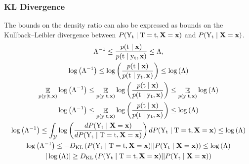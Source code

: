 
\subsubsection{KL Divergence}
\label{app:kld}
The bounds on the density ratio can also be expressed as bounds on the Kullback–Leibler divergence between $P(\Yt \mid \Tf=\tf, \X=\x)$ and $P(\Yt \mid \X=\x)$.
\begin{gather}
    \Lambda^{-1} \leq \frac{p(\tf \mid \x)}{p(\tf \mid \yt, \x)} \leq \Lambda, \\
    \log{\left(\Lambda^{-1}\right)}  \leq \log{\left(\frac{p(\tf \mid \x)}{p(\tf \mid \yt, \x)}\right)}  \leq \log{\left(\Lambda\right)} \\
    \E_{p(\y \mid \tf, \x)}\log{\left(\Lambda^{-1}\right)}  \leq \E_{p(\y \mid \tf, \x)}\log{\left(\frac{p(\tf \mid \x)}{p(\tf \mid \yt, \x)}\right)}  \leq \E_{p(\y \mid \tf, \x)}\log{\left(\Lambda\right)} \\
    \log{\left(\Lambda^{-1}\right)}  \leq \E_{p(\y \mid \tf, \x)}\log{\left(\frac{p(\tf \mid \x)}{p(\tf \mid \yt, \x)}\right)}  \leq \log{\left(\Lambda\right)} \\
    \log{\left(\Lambda^{-1}\right)} \leq  \int_{\Ycal}\log\left(\frac{dP(\Yt \mid \X=\x)}{dP(\Yt \mid \Tf=\tf, \X=\x)}\right)dP(\Yt \mid \Tf=\tf, \X=\x)  \leq \log{\left(\Lambda\right)} \\
    \log{\left(\Lambda^{-1}\right)} \leq  -D_{\mathrm{KL}}\left( P(\Yt \mid \Tf=\tf, \X=\x) || P(\Yt \mid \X=\x) \right)  \leq \log{\left(\Lambda\right)} \\
    |\log{\left(\Lambda\right)}| \geq  D_{\mathrm{KL}}\left( P(\Yt \mid \Tf=\tf, \X=\x) || P(\Yt \mid \X=\x) \right)
\end{gather}
